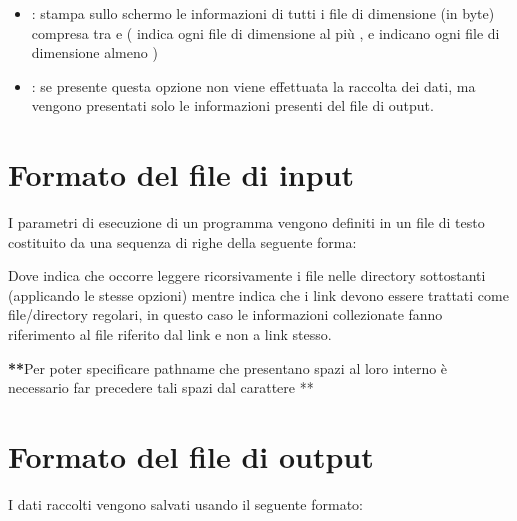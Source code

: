 \documentclass[letterpaper,10pt,italian,openany,oneside]{sphinxmanual}
\begin{document}
\begin{itemize}
\item {} 
: stampa sullo schermo le informazioni di tutti i file di dimensione (in byte) compresa tra  e  ( indica ogni file di dimensione al più ,  e  indicano ogni file di dimensione almeno )

\item {} 
: se presente questa opzione non viene effettuata la raccolta dei dati, ma vengono presentati solo le informazioni presenti del file di output.

\end{itemize}


\section{Formato del file di input}
\label{\detokenize{introduzione:formato-del-file-di-input}}
I parametri di esecuzione di un programma vengono definiti in un file di testo costituito da una sequenza di righe della seguente forma:

\begin{sphinxVerbatim}[commandchars=\\\{\}]
 \PYG{p}{[}\PYG{p}{]} \PYG{p}{[}\PYG{p}{]}
\end{sphinxVerbatim}

Dove  indica che occorre leggere ricorsivamente i file nelle directory sottostanti (applicando le stesse opzioni) mentre  indica che i link devono essere trattati come file/directory regolari, in questo caso le informazioni collezionate fanno riferimento al file riferito dal link e non a link stesso.

{\color{red}\bfseries{}**}Per poter specificare pathname che presentano spazi al loro interno è necessario far precedere tali spazi dal carattere **


\section{Formato del file di output}
\label{\detokenize{introduzione:formato-del-file-di-output}}
I dati raccolti vengono salvati usando il seguente formato:
\end{document}
